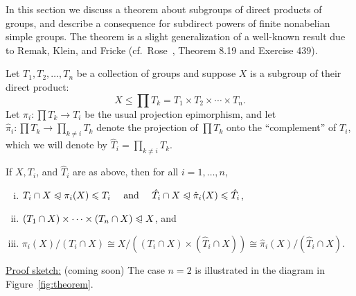 In this section we discuss a theorem about subgroups of direct products of
groups, and describe a consequence for subdirect powers of finite nonabelian
simple groups.  The theorem is a slight generalization of a well-known result
due to Remak, Klein, and Fricke (cf.~Rose~\cite{Rose:1978}, Theorem 
8.19 and Exercise 439).

Let $T_1, T_2, \dots, T_n$ be a collection of groups and suppose $X$ is a
subgroup of their direct product:
\[
X \leq \prod T_k = T_1 \times T_2 \times \cdots \times T_n.  
\]
Let $\pi_i: \prod T_k \rightarrow T_i$ be the usual projection
epimorphism, and let $\hat{\pi}_i : \prod T_k \rightarrow \prod\limits_{k\neq i} T_k$ denote the
projection of  $\prod T_k$ onto the ``complement'' of $T_i$, which we will
denote by $\hat{T}_i = \prod\limits_{k\neq i}T_k$.
\begin{theorem}
\label{thm:1} If $X, T_i$, and $\hat{T}_i$ are as above, 
 then for all $i=1,\dots, n$, 
  \begin{enumerate}[(i)]
  \item $T_i \cap X \trianglelefteqslant \pi_i(X) \leqslant T_i \quad \text{ and } \quad 
\hat{T}_i\cap X \trianglelefteqslant \hat{\pi}_i(X)\leqslant \hat{T}_i$,
\item  $(T_1\cap X) \times \cdots \times (T_n\cap X) \trianglelefteqslant X$, and
\item
$\pi_i(X) /(T_i \cap X)\cong 
X/\left((T_i\cap X) \times (\hat{T}_i\cap X)\right) \cong 
\hat{\pi}_i(X) /(\hat{T}_i\cap X).$
  \end{enumerate}
\end{theorem}
\noindent \underline{Proof sketch:} (coming soon) The case $n=2$ is illustrated in the diagram
in Figure~\ref{fig:theorem}.

